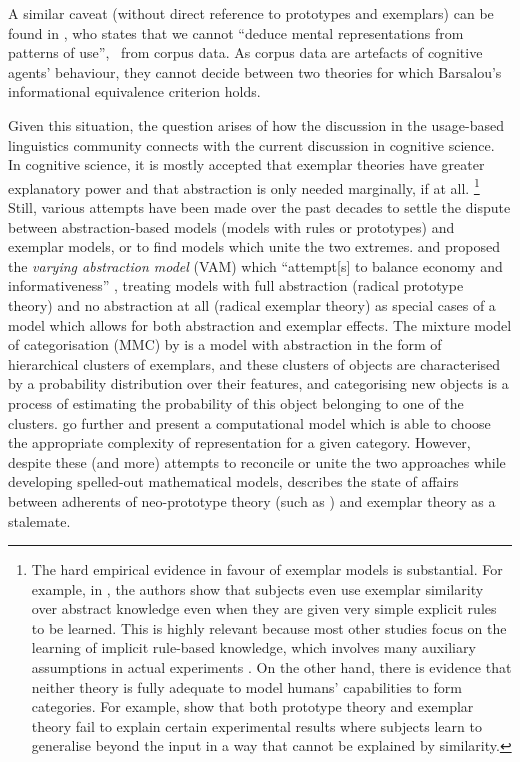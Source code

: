 A similar caveat (without direct reference to prototypes and exemplars) can be found in \citet[486--487]{Dabrowska2016}, who states that we cannot ``deduce mental representations from patterns of use'', \ie\ from corpus data.\label{abs:dabrowska}
As corpus data are artefacts of cognitive agents' behaviour, they cannot decide between two theories for which Barsalou's informational equivalence criterion holds.

Given this situation, the question arises of how the discussion in the usage-based linguistics community connects with the current discussion in cognitive science.
In cognitive science, it is mostly accepted that exemplar theories have greater explanatory power \citep[184]{Vanpaemel2016} and that abstraction is only needed marginally, if at all.%
\footnote{The hard empirical evidence in favour of exemplar models is substantial.
For example, in \citet{HahnEa2010}, the authors show that subjects even use exemplar similarity over abstract knowledge even when they are given very simple explicit rules to be learned.
This is highly relevant because most other studies focus on the learning of implicit rule-based knowledge, which involves many auxiliary assumptions in actual experiments \citep[2]{HahnEa2010}.
On the other hand, there is evidence that neither theory is fully adequate to model humans' capabilities to form categories.
For example, \citet{ConawayKurtz2016} show that both prototype theory and exemplar theory fail to explain certain experimental results where subjects learn to generalise beyond the input in a way that cannot be explained by similarity.
}
Still, various attempts have been made over the past decades to settle the dispute between abstraction-based models (models with rules or prototypes) and exemplar models, or to find models which unite the two extremes.
\citet{VanpaemelStorms2008} and \citet{LeeVanpaemel2008} proposed the \textit{varying abstraction model} (VAM) which ``attempt[s] to balance economy and informativeness'' \citep[745]{LeeVanpaemel2008}, treating models with full abstraction (radical prototype theory) and no abstraction at all (radical exemplar theory) as special cases of a model which allows for both abstraction and exemplar effects.
The mixture model of categorisation (MMC) by \citet{Rosseel2002} is a model with abstraction in the form of hierarchical clusters of exemplars, and these clusters of objects are characterised by a probability distribution over their features, and categorising new objects is a process of estimating the probability of this object belonging to one of the clusters.
\citet{GriffithsEa2009} go further and present a computational model which is able to choose the appropriate complexity of representation for a given category.
However, despite these (and more) attempts to reconcile or unite the two approaches while developing spelled-out mathematical models, \citet[183--184]{Vanpaemel2016} describes the state of affairs between adherents of neo-prototype theory (such as \citealt{MindaSmith2001,MindaSmith2002}) and exemplar theory as a stalemate.

